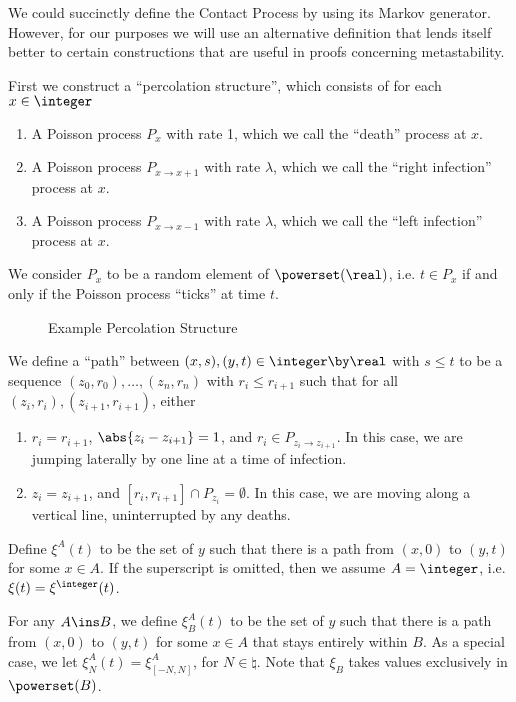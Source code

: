 \documentclass{scrartcl}
\begin{document}
We could succinctly define the Contact Process by using its Markov generator. However, for our purposes we will use
an alternative definition that lends itself better to certain constructions that are useful in proofs concerning metastability.

First we construct a ``percolation structure'', which consists of for each $x \in \integer$
\begin{enumerate}
  \item A Poisson process $P_{x}$ with rate 1, which we call the ``death'' process at $x$.
  \item A Poisson process $P_{x \to x+1}$ with rate $\lambda$, which we call the ``right infection'' process at $x$.
  \item A Poisson process $P_{x \to x-1}$ with rate $\lambda$, which we call the ``left infection'' process at $x$.
\end{enumerate}

We consider $P_{x}$ to be a random element of $\powerset(\real)$, i.e. $t \in P_{x}$ if and only if the Poisson process ``ticks'' at time $t$.

\begin{figure}[h!]
  \centering
  \caption{Example Percolation Structure}
  \label{fig:ex_perc_structure}
\end{figure}

We define a ``path'' between $(x,s), (y,t) \in \integer \by \real$ with $s \leq t$ to be a sequence
$(z_{0},r_{0}), \ldots, (z_{n},r_{n})$ with $r_{i} \leq r_{i+1}$ such that for all $(z_{i},r_{i}),(z_{i+1},r_{i+1})$, either
\begin{enumerate}
  \item $r_{i} = r_{i+1}$, $\abs{z_{i} - z_{i+1}} = 1$, and $r_{i} \in P_{z_{i} \to z_{i+1}}$. In this case, we are jumping laterally by one line at a time of infection.
  \item $z_{i} = z_{i+1}$, and $[r_{i},r_{i+1}] \cap P_{z_{i}} = \emptyset$. In this case, we are moving along a vertical line, uninterrupted by any deaths.
\end{enumerate}

Define $\xi^{A}(t)$ to be the set of $y$ such that there is a path from $(x,0)$ to $(y,t)$ for some $x \in A$. If the superscript is omitted, then we assume $A = \integer$, i.e. $\xi(t) = \xi^{\integer}(t)$.

For any $A \ins B$, we define $\xi_{B}^{A}(t)$ to be the set of $y$ such that there is a path from $(x,0)$ to $(y,t)$ for some $x \in A$ that stays entirely within $B$. As a special case, we let $\xi_{N}^{A}(t) = \xi_{[-N,N]}^{A}$, for $N \in \natural$. Note that $\xi_{B}$ takes values exclusively in $\powerset(B)$.
\end{document}

